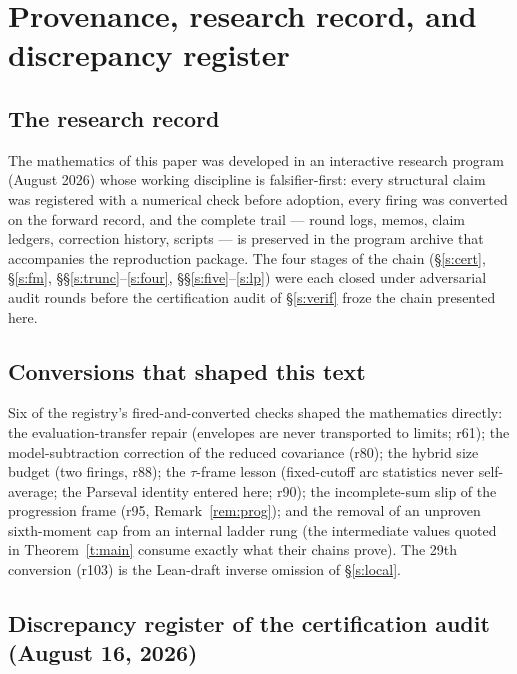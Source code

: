 \documentclass[11pt]{article}
\numberwithin{equation}{section}
\theoremstyle{definition}
\theoremstyle{remark}
\begin{document}
\section{Provenance, research record, and discrepancy
register}\label{a:record}

\subsection*{The research record}

The mathematics of this paper was developed in an interactive
research program (August 2026) whose working discipline is
falsifier-first: every structural claim was registered with a
numerical check before adoption, every firing was converted on
the forward record, and the complete trail --- round logs,
memos, claim ledgers, correction history, scripts --- is
preserved in the program archive that accompanies the
reproduction package. The four stages of the chain
(\S\ref{s:cert}, \S\ref{s:fm},
\S\S\ref{s:trunc}--\ref{s:four},
\S\S\ref{s:five}--\ref{s:lp}) were each closed under
adversarial audit rounds before the certification audit of
\S\ref{s:verif} froze the chain presented here.

\subsection*{Conversions that shaped this text}

Six of the registry's fired-and-converted checks shaped the
mathematics directly: the evaluation-transfer repair (envelopes
are never transported to limits; r61); the model-subtraction
correction of the reduced covariance (r80); the hybrid size
budget (two firings, r88); the $\tau$-frame lesson (fixed-cutoff
arc statistics never self-average; the Parseval identity entered
here; r90); the incomplete-sum slip of the progression frame
(r95, Remark~\ref{rem:prog}); and the removal of an unproven
sixth-moment cap from an internal ladder rung (the intermediate
values quoted in Theorem~\ref{t:main} consume exactly what their
chains prove). The 29th conversion (r103) is the Lean-draft
inverse omission of \S\ref{s:local}.

\subsection*{Discrepancy register of the certification audit
(August 16, 2026)}
\end{document}
